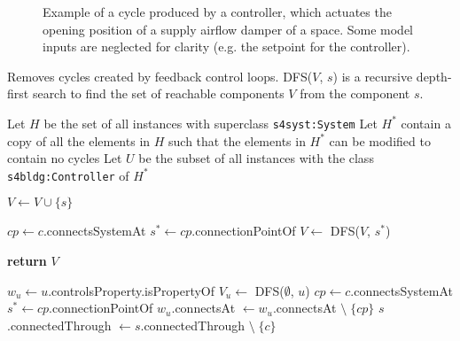 \begin{figure}[H]
    \centering
    
    \caption{Example of a cycle produced by a controller, which actuates the opening position of a supply airflow damper of a space. Some model inputs are neglected for clarity (e.g. the setpoint for the controller).}
    \label{fig:data_structure_cycle}
\end{figure}



\begin{algorithm}[H]
\caption{Removes cycles created by feedback control loops. DFS($V$, $s$) is a recursive depth-first search to find the set of reachable components $V$ from the component $s$.}
\label{alg:remove_cycles}

\begin{algorithmic}[1]
    \State Let $H$ be the set of all instances with superclass \texttt{s4syst:System}
    \State Let $H^*$ contain a copy of all the elements in $H$ such that the elements in $H^*$ can be modified to contain no cycles
    \State Let $U$ be the subset of all instances with the class \texttt{s4bldg:Controller} of $H^*$ 
    
        \State $V \gets V \cup \{s\}$
        
            \State $cp \gets c$.connectsSystemAt
            \State $s^* \gets cp$.connectionPointOf 
                \State $V \gets$ DFS($V$, $s^*$)
            \EndIf
        \EndFor
        
        \State \textbf{return} $V$
    \EndFunction

        \State $w_u \gets u$.controlsProperty.isPropertyOf
        \State $V_u \gets$ DFS($\emptyset$, $u$)
                \State $cp \gets c$.connectsSystemAt
                \State $s^* \gets cp$.connectionPointOf 
                    \State $w_u$.connectsAt $\gets w_u$.connectsAt $\setminus \; \{cp\}$ 
                    \State $s$.connectedThrough $\gets s$.connectedThrough $\setminus \; \{c\}$
                \EndIf
            \EndFor

        \EndFor
    \EndFor
\end{algorithmic}
\end{algorithm}

